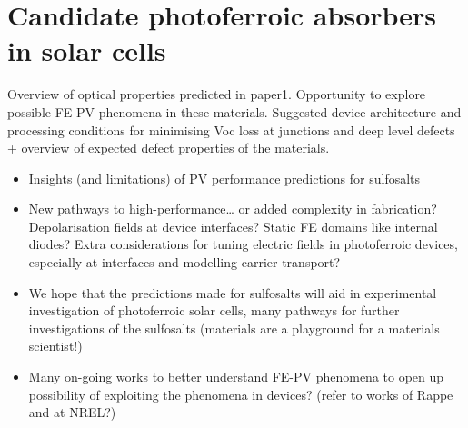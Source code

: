 \documentclass[11pt, twoside]{report}
\begin{document}
\section{Candidate photoferroic absorbers in solar cells}
Overview of optical properties predicted in paper1. Opportunity to explore possible FE-PV phenomena in these materials. Suggested device architecture and processing conditions for minimising Voc loss at junctions and deep level defects + overview of expected defect properties of the materials.
\begin{itemize}
\item Insights (and limitations) of PV performance predictions for sulfosalts
\item New pathways to high-performance… or added complexity in fabrication? Depolarisation fields at device interfaces? Static FE domains like internal diodes? Extra considerations for tuning electric fields in photoferroic devices, especially at interfaces and modelling carrier transport?
\item We hope that the predictions made for sulfosalts will aid in experimental investigation of photoferroic solar cells, many pathways for further investigations of the sulfosalts (materials are a playground for a materials scientist!)
\item Many on-going works to better understand FE-PV phenomena to open up possibility of exploiting the phenomena in devices? (refer to works of Rappe and at NREL?)
\end{itemize}

\appendix
\end{document}
